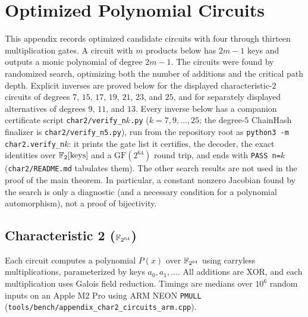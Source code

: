 \section{Optimized Polynomial Circuits}\label{appendix:polynomials}

This appendix records optimized candidate circuits with four through thirteen
multiplication gates.  A circuit with $m$ products below has $2m-1$ keys and
outputs a monic polynomial of degree $2m-1$.  The circuits were found by
randomized search, optimizing both the number of additions and the critical
path depth.  Explicit inverses are proved below for the displayed characteristic-$2$
circuits of degrees $7$, $15$, $17$, $19$, $21$, $23$, and $25$, and for
separately displayed alternatives of degrees $9$, $11$, and $13$.  Every
inverse below has a companion certificate script
\texttt{char2/verify\_n$k$.py} ($k=7,9,\ldots,25$; the degree-$5$ ChainHash
finalizer is \texttt{char2/verify\_n5.py}), run from the repository root as
\texttt{python3 -m char2.verify\_n$k$}: it prints the gate list it certifies,
the decoder, the exact identities over $\mathbb{F}_2[\text{keys}]$ and a
$\mathrm{GF}(2^{64})$ round trip, and ends with \texttt{PASS n=$k$}
(\texttt{char2/README.md} tabulates them).  The other
search results are not used in the proof of the main theorem.  In particular, a constant nonzero Jacobian found
by the search is only a diagnostic (and a necessary condition for a
polynomial automorphism), not a proof of bijectivity.

\subsection{Characteristic 2 (\texorpdfstring{$\mathbb{F}_{2^{64}}$}{GF(2\^{}64)})}

Each circuit computes a polynomial $P(x)$ over $\mathbb{F}_{2^{64}}$ using carryless multiplications,
parameterized by keys $a_0, a_1, \ldots$.
All additions are XOR, and each multiplication uses Galois field reduction.
Timings are medians over $10^6$ random inputs on an Apple M2 Pro using ARM NEON
\texttt{PMULL} (\texttt{tools/bench/appendix\_char2\_circuits\_arm.cpp}).


